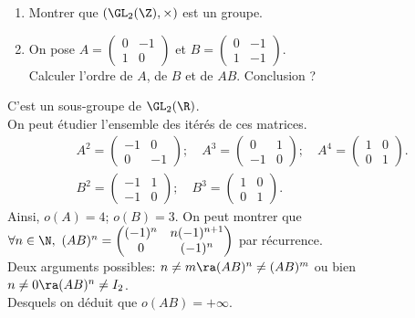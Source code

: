 \documentclass[11pt]{article}
\begin{document}
\begin{ex}{}{}
    \begin{enumerate}
        \item Montrer que $(\GL_2(\Z),\times)$ est un groupe.
        \item On pose $A=\begin{pmatrix}0&-1\\1&0\end{pmatrix}$ et $B=\begin{pmatrix}0&-1\\1&-1\end{pmatrix}$.\\
        Calculer l'ordre de $A$, de $B$ et de $AB$. Conclusion ?
    \end{enumerate}
    \tcblower
     C'est un sous-groupe de $\GL_2(\R)$.\\
     On peut étudier l'ensemble des itérés de ces matrices.
    \begin{align*}
        &A^2=\begin{pmatrix}-1&0\\0&-1\end{pmatrix}; \quad A^3=\begin{pmatrix}0&1\\-1&0\end{pmatrix}; \quad A^4=\begin{pmatrix}1&0\\0&1\end{pmatrix}.\\
        &B^2=\begin{pmatrix}-1&1\\-1&0\end{pmatrix}; \quad B^3=\begin{pmatrix}1&0\\0&1\end{pmatrix}.
    \end{align*}
    Ainsi, $o(A)=4$; $o(B)=3$.\n
    On peut montrer que $\forall n \in \N, ~ (AB)^n=\begin{pmatrix}(-1)^n&n(-1)^{n+1}\\0&(-1)^n\end{pmatrix}$ par récurrence.\\
    Deux arguments possibles: $n\neq m\ra (AB)^n\neq(AB)^m$ ou bien $n\neq0\ra(AB)^n\neq I_2$.\\
    Desquels on déduit que $o(AB)=+\infty$.
\end{ex}

\vspace*{-0.8cm}
\end{document}

